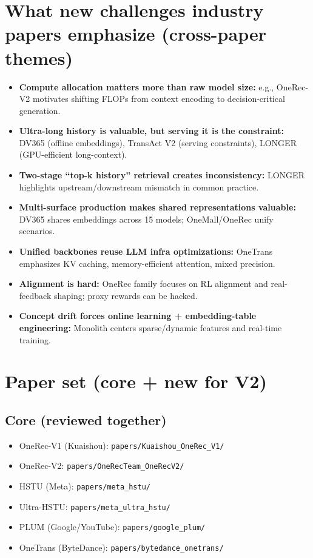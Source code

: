 \documentclass[11pt]{article}
\begin{document}
\section{What new challenges industry papers emphasize (cross-paper themes)}
\begin{itemize}
  \item \textbf{Compute allocation matters more than raw model size:} e.g., OneRec-V2 motivates shifting FLOPs from context encoding to decision-critical generation.
  \item \textbf{Ultra-long history is valuable, but serving it is the constraint:} DV365 (offline embeddings), TransAct V2 (serving constraints), LONGER (GPU-efficient long-context).
  \item \textbf{Two-stage ``top-k history'' retrieval creates inconsistency:} LONGER highlights upstream/downstream mismatch in common practice.
  \item \textbf{Multi-surface production makes shared representations valuable:} DV365 shares embeddings across 15 models; OneMall/OneRec unify scenarios.
  \item \textbf{Unified backbones reuse LLM infra optimizations:} OneTrans emphasizes KV caching, memory-efficient attention, mixed precision.
  \item \textbf{Alignment is hard:} OneRec family focuses on RL alignment and real-feedback shaping; proxy rewards can be hacked.
  \item \textbf{Concept drift forces online learning + embedding-table engineering:} Monolith centers sparse/dynamic features and real-time training.
\end{itemize}

\section{Paper set (core + new for V2)}
\subsection*{Core (reviewed together)}
\begin{itemize}
  \item OneRec-V1 (Kuaishou): \texttt{papers/Kuaishou\_OneRec\_V1/}
  \item OneRec-V2: \texttt{papers/OneRecTeam\_OneRecV2/}
  \item HSTU (Meta): \texttt{papers/meta\_hstu/}
  \item Ultra-HSTU: \texttt{papers/meta\_ultra\_hstu/}
  \item PLUM (Google/YouTube): \texttt{papers/google\_plum/}
  \item OneTrans (ByteDance): \texttt{papers/bytedance\_onetrans/}
\end{itemize}
\end{document}
